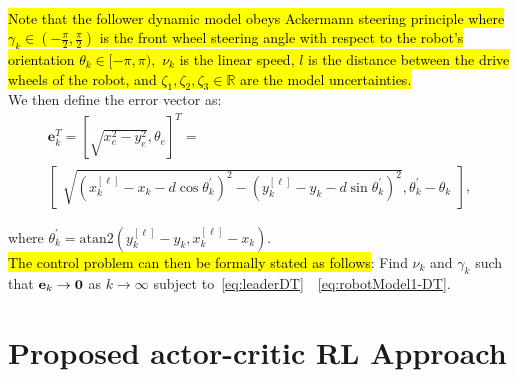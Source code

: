 \documentclass[conference]{IEEEtran}
\begin{document}
 \\
\hl{Note that the follower dynamic model obeys Ackermann steering principle where $\gamma_k\in(-\frac{\pi}{2},\frac{\pi}{2})$ is the front wheel steering angle with respect to the robot's orientation $\theta_k\in[-\pi,\pi),$ $\nu_k$ is the linear speed, $l$ is the distance between the drive wheels of the robot, and $\zeta_1,\zeta_2,\zeta_3\in\mathbb{R}$ are the model uncertainties.} 
\\
We then define the error vector as:
 \begin{multline}
     \label{eq:stateError}
   \mathbf{e}_k^T = [\sqrt{x_e^2-y_e^2},\theta_e]^T = \\
   \begin{bmatrix}
     \sqrt{(x_k^{[\ell]} - x_k - d\cos\theta_k^{'})^2-
     (y_k^{[\ell]} - y_k - d\sin\theta_k^{'})^2},
     \theta_k^{'} - \theta_k
   \end{bmatrix},
 \end{multline}
 
 where $\theta_k^{'} = \mathrm{atan2}\left(y_k^{[\ell]}-y_k, x_k^{[\ell]}-x_k\right).$  
\\
\hl{The control problem can then be formally stated as follows}: Find $\nu_k$ and $\gamma_k$ such that ${\bf e}_k\to {\bf 0}$ as  $k\to\infty$ subject to~\eqref{eq:leaderDT}~~\eqref{eq:robotModel1-DT}.

%
%




\section{Proposed actor-critic RL Approach}

 \label{sec:RLSolution}
\end{document}
